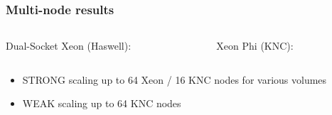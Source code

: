 \documentclass{beamer}
\begin{document}
  \begin{frame}
    \frametitle{Multi-node results}
    \footnotesize

    \begin{columns}[T]
      \begin{column}{.5\textwidth}
        \begin{center}
          Dual-Socket Xeon (Haswell):\\
          \vfill
        \end{center}
      \end{column}
      \begin{column}{.5\textwidth}
        \begin{center}
          Xeon Phi (KNC):\\
          \vfill
        \end{center}
      \end{column}
    \end{columns}

    \bigskip

    \begin{itemize}
      \item STRONG scaling up to 64 Xeon / 16 KNC nodes for various volumes
        \vfill
      \item WEAK scaling up to 64 KNC nodes
        \vfill
    \end{itemize}

  \end{frame}

\end{document}
